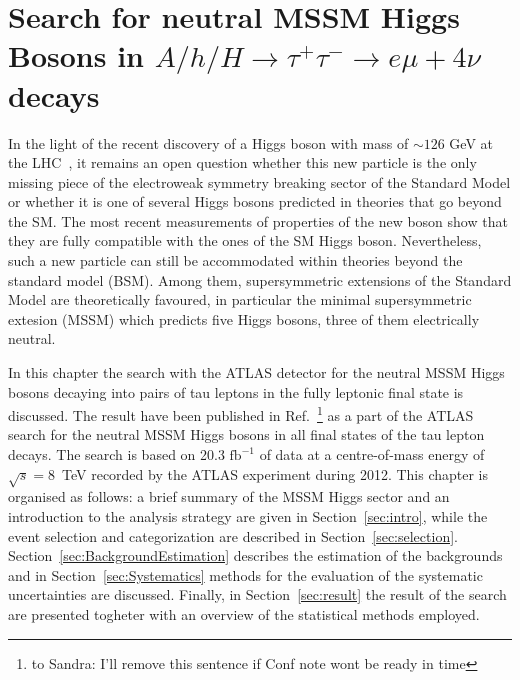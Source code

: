 \chapter[Neutral MSSM Higgs Bosons Search]{Search for neutral MSSM Higgs Bosons in  
$A/h/H \rightarrow \tau^{+}\tau^{-} \rightarrow e \mu + 4\nu$ decays} \label{chap:anal}


%
 \vspace{0.5cm}

%
%
In the light of the recent discovery of a Higgs 
boson with mass of $\sim 126$ GeV at the LHC~\cite{AHiggsO,CHiggsO}, it remains an open question
whether this new particle is the only missing piece of the electroweak symmetry breaking
sector of the Standard Model or whether it is one of several Higgs bosons predicted in  theories 
that go beyond the SM. The most recent measurements \cite{ASpin0,ACouplings,CFermions,CWidth} of 
properties of the new boson show that they are fully compatible with the ones of the SM Higgs boson. 
Nevertheless, such a new particle can still be accommodated within theories beyond the 
standard model (BSM). Among  them, supersymmetric extensions of the Standard Model are theoretically favoured,
in particular the minimal supersymmetric extesion (MSSM) which predicts five Higgs bosons, three of them electrically neutral.

In this chapter  the search  with the ATLAS detector for the neutral MSSM Higgs bosons decaying into pairs of tau leptons
in the fully leptonic final state is discussed. 
The result have been published in Ref.~\cite{}\footnote{to Sandra: I'll remove this sentence
if Conf note wont be ready in time} as a part of the ATLAS search for the neutral
MSSM Higgs bosons in all final states of the tau lepton decays. 
The search is based on 20.3 $\text{fb}^{-1}$ of  data at a centre-of-mass energy of $\sqrt{s} = 8$~TeV
recorded by the ATLAS experiment during 2012.
This chapter is organised as follows: a brief summary of the MSSM Higgs sector 
and an introduction to the analysis strategy are given in Section~\ref{sec:intro},
while the event selection and categorization are described in Section~\ref{sec:selection}. 
Section~\ref{sec:BackgroundEstimation} describes the estimation of the backgrounds and
in Section~\ref{sec:Systematics} methods for the evaluation of the  systematic uncertainties are discussed. Finally, 
in Section~\ref{sec:result} the result of the search are presented togheter with an overview of the statistical methods employed.


